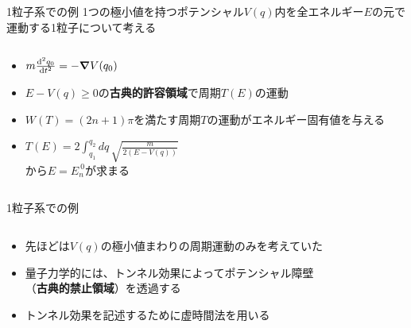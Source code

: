 \documentclass[14pt,aspectratio=169,xcolor=dvipsnames,table,dvipdfmx]{beamer}
\theoremstyle{definition}
\begin{document}
\begin{frame}{1粒子系での例}
  1つの極小値を持つポテンシャル$V(q)$内を全エネルギー$E$の元で運動する1粒子について考える
  \begin{columns}[t]
    \begin{column}{.47\textwidth}
      \begin{itemize}
        \item $m\dv[2]{q_0}{t} = -\grad V(q_0)$
        \item $E-V(q)\geq0$の\textbf{古典的許容領域}で周期$T(E)$の運動
        \item $W(T)=(2n+1)\pi$を満たす周期$T$の運動がエネルギー固有値を与える
        \item $T(E)=2\int_{q_1}^{q_2}dq\,\sqrt{\frac{m}{2(E-V(q))}}$\\から$E=E_{n}^{~0}$が求まる
      \end{itemize}
    \end{column}
    \begin{column}{.5\textwidth}
    \end{column}
  \end{columns}
\end{frame}

\begin{frame}{1粒子系での例}
  \begin{columns}[t]
    \begin{column}{.54\textwidth}
      \begin{itemize}
        \item 先ほどは$V(q)$の極小値まわりの周期運動のみを考えていた
        \item 量子力学的には、トンネル効果によってポテンシャル障壁\\（{\color{AlertOrange}\textbf{古典的禁止領域}}）を透過する
        \item トンネル効果を記述するために虚時間法を用いる
      \end{itemize}
    \end{column}
    \begin{column}{.5\textwidth}
    \end{column}
  \end{columns}
\end{frame}
\end{document}
